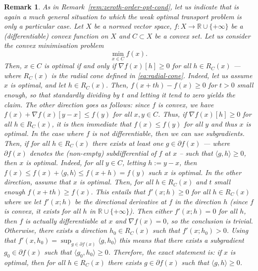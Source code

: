 \documentclass[leqno, 11pt, a4paper]{amsart}
\newtheorem{rem}{Remark}
\theoremstyle{definition}
\newcommand{\R}{\mathbb{R}}
\newcommand{\scal}[2]{\langle #1, #2 \rangle}
\newcommand{\extendedR}{\R \cup \{+\infty\}}
\begin{document}
\begin{rem}\label{rem:first-order-opt-cond}
	As in Remark~\ref{rem:zeroth-order-opt-cond}, let us indicate that is again a much general situation to which the weak optimal transport problem is only a particular case.  Let $X$ be a normed vector space, $f : X \to \extendedR$ be a (\textit{differentiable}) convex function on $X$ and $C \subset X$ be a convex set. Let us consider the convex minimisation problem
	\begin{equation}
		\min_{x \in C} f(x).
	\end{equation}
	Then, $x \in C$ is optimal if and only if $\nabla f(x)[h] \geq 0$ for all $h \in R_C(x)$ — where  $R_C(x)$ is the radial cone defined in \eqref{eq:radial-cone}. Indeed, let us assume $x$ is optimal, and let $h \in R_C(x)$. Then, $f(x + th) - f(x) \geq 0$ for $t > 0$ small enough, so that standardly dividing by $t$ and letting it tend to zero yields the claim. The other direction goes as follows: since $f$ is convex, we have $f(x) + \nabla f(x)[y - x] \leq f(y)$ for all $x, y \in C$. Thus, if $\nabla f(x)[h] \geq 0$ for all $h \in R_C(x)$, it is then immediate that $f(x) \leq f(y)$ for all $y$ and thus $x$ is optimal. In the case where $f$ is not differentiable, then we can use \textit{subgradients}. Then, if for all $h \in R_C(x)$ there exists at least one $g \in \partial f(x)$ — where $\partial f(x)$ denotes the (non-empty) subdifferential of $f$ at $x$ -- such that $\scal{g}{h} \geq 0$, then $x$ is optimal. Indeed, for all $y \in C$, letting $h := y - x$, then $f(x) \leq f(x) + \scal{g}{h} \leq f(x + h) = f(y)$ such $x$ is optimal. In the other direction, assume that $x$ is optimal. Then, for all $h \in R_C(x)$ and $t$ small enough $f(x + th) \geq f(x)$. This entails that $f'(x; h) \geq 0$ for all $h \in R_C(x)$ where we let $f'(x; h)$ be the directional derivative at $f$ in the direction $h$ (since $f$ is convex, it exists for all $h$ in $\extendedR$). Then either $f'(x; h) = 0$ for all $h$, then $f$ is actually differentiable at $x$ and $\nabla f(x) = 0$, so the conclusion is trivial. Otherwise, there exists a direction $h_0 \in R_C(x)$ such that $f'(x; h_0) > 0$. Using that $f'(x, h_0) = \sup_{g \in \partial f(x)} \scal{g}{h_0}$ this means that there exists a subgradient $g_0 \in \partial f(x)$ such that $\scal{g_0}{h_0} \geq 0$. Therefore, the exact statement is: if $x$ is optimal, then for all $h \in R_C(x)$ there exists $g \in \partial f(x)$ such that $\scal{g}{h}\geq0$.
\end{rem}
\end{document}
